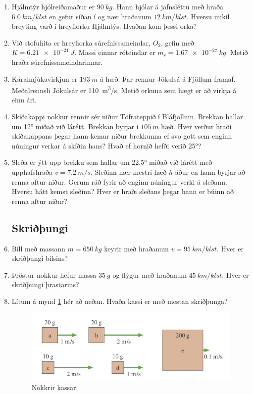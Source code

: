 \ifdefined \wholebook \else\documentclass[oneside]{book}\usepackage{EdlBook}\graphicspath{{figures/}}
\begin{document}
\begin{enumerate}[label = \textbf{Dæmi \thechapter.\arabic*.}]
\item Hjálmtýr hjólreiðamaður er $\SI{90}{kg}$. Hann hjólar á jafnsléttu með hraða $\SI{6.0}{km/klst}$ en gefur síðan í og nær hraðanum $\SI{12}{km/klst}$. Hversu mikil breyting varð í hreyfiorku Hjálmtýs. Hvaðan kom þessi orka?

\item Við stofuhita er hreyfiorka súrefnissameindar, $O_2$, gefin með $ K = \SI{6.21e-21}{J}$. Massi einnar róteindar er $m_r = \SI{1.67e-27}{kg}$. Metið hraða súrefnissameindarinnar.

\item Kárahnjúkavirkjun er $\SI{193}{m}$ á hæð. Þar rennur Jökulsá á Fjöllum framaf. Meðalrennsli Jökulsár er \SI{110}{m^3/s}. Metið orkuna sem hægt er að virkja á einu ári.

\item Skíðakappi nokkur rennir sér niður Töfrateppið í Bláfjöllum. Brekkan hallar um \ang{12} miðað við lárétt. Brekkan byrjar í $\SI{105}{m}$ hæð. Hver verður hraði skíðakappans þegar hann kemur niður brekkunna ef svo gott sem enginn núningur verkar á skíðin hans? Hvað ef hornið hefði verið \ang{25}?

\item Sleða er ýtt upp brekku sem hallar um \ang{22.5} miðað við lárétt með upphafshraða $v = \SI{7.2}{m/s}$. Sleðinn nær mestri hæð $h$ áður en hann byrjar að renna aftur niður. Gerum ráð fyrir að enginn núningur verki á sleðann. Hversu hátt kemst sleðinn? Hver er hraði sleðans þegar hann er búinn að renna aftur niður?

\subsection*{Skriðþungi}

\item Bíll með massann $m = \SI{650}{kg}$ keyrir með hraðanum $v = \SI{95}{km/klst}$. Hver er skriðþungi bílsins?

\item Þröstur nokkur hefur massa $\SI{35}{g}$ og flýgur með hraðanum $\SI{45}{km/klst}$. Hver er skriðþungi þrastarins?

\item Lítum á mynd \ref{fig:sbrkassar2} hér að neðan. Hvaða kassi er með mestan skriðþunga?

\begin{figure}[H]
    \centering
    \includegraphics[scale = 0.3]{images/sbr.png}
    \caption{Nokkrir kassar.}
    \label{fig:sbrkassar2}
\end{figure}


\end{enumerate}
\end{document}
